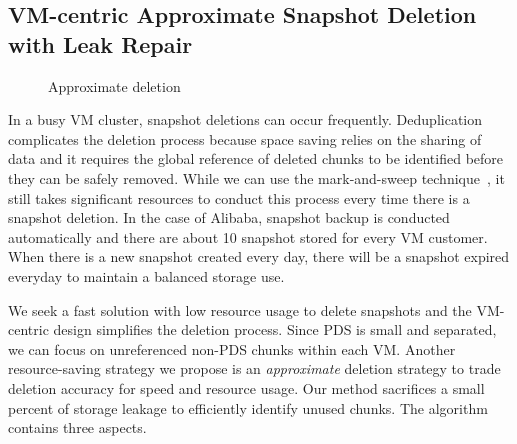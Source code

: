\subsection{ VM-centric Approximate Snapshot Deletion with Leak Repair}
\label{sect:delete}

\begin{figure}[htbp]
  \centering
  \caption{Approximate deletion}
  \label{fig:deletion_flow}
\end{figure}

In a busy VM cluster, snapshot deletions can occur frequently.
Deduplication complicates the deletion process because space saving relies on the sharing of data
and it requires the global reference of deleted chunks to be identified before  they can be safely removed.
While we can use the mark-and-sweep technique~\cite{Guo2011}, 
it still takes significant resources to conduct this process every time there is a snapshot deletion.
In the case of Alibaba, snapshot backup is conducted automatically and there are 
about 10 snapshot stored for every VM customer. When there is
a new snapshot created every day,  there will be  a snapshot expired everyday to maintain
a balanced storage use. 

We seek a fast solution with low resource usage to delete snapshots and
the VM-centric design simplifies the deletion process. 
Since PDS is small and separated, we can focus on  unreferenced non-PDS chunks within each VM. 
Another resource-saving strategy we propose is
an {\em approximate} deletion strategy to trade deletion accuracy for
speed and resource usage. Our method sacrifices a small percent of storage leakage
to efficiently identify unused chunks.
The algorithm contains three aspects.

